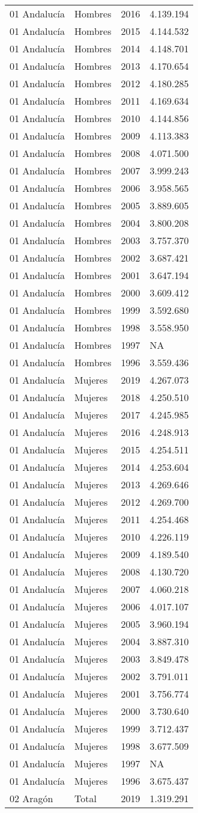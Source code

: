 \documentclass[
]{article}
\begin{document}
\begin{longtable}[]{@{}llrl@{}}
01 Andalucía & Hombres & 2016 & 4.139.194\tabularnewline
01 Andalucía & Hombres & 2015 & 4.144.532\tabularnewline
01 Andalucía & Hombres & 2014 & 4.148.701\tabularnewline
01 Andalucía & Hombres & 2013 & 4.170.654\tabularnewline
01 Andalucía & Hombres & 2012 & 4.180.285\tabularnewline
01 Andalucía & Hombres & 2011 & 4.169.634\tabularnewline
01 Andalucía & Hombres & 2010 & 4.144.856\tabularnewline
01 Andalucía & Hombres & 2009 & 4.113.383\tabularnewline
01 Andalucía & Hombres & 2008 & 4.071.500\tabularnewline
01 Andalucía & Hombres & 2007 & 3.999.243\tabularnewline
01 Andalucía & Hombres & 2006 & 3.958.565\tabularnewline
01 Andalucía & Hombres & 2005 & 3.889.605\tabularnewline
01 Andalucía & Hombres & 2004 & 3.800.208\tabularnewline
01 Andalucía & Hombres & 2003 & 3.757.370\tabularnewline
01 Andalucía & Hombres & 2002 & 3.687.421\tabularnewline
01 Andalucía & Hombres & 2001 & 3.647.194\tabularnewline
01 Andalucía & Hombres & 2000 & 3.609.412\tabularnewline
01 Andalucía & Hombres & 1999 & 3.592.680\tabularnewline
01 Andalucía & Hombres & 1998 & 3.558.950\tabularnewline
01 Andalucía & Hombres & 1997 & NA\tabularnewline
01 Andalucía & Hombres & 1996 & 3.559.436\tabularnewline
01 Andalucía & Mujeres & 2019 & 4.267.073\tabularnewline
01 Andalucía & Mujeres & 2018 & 4.250.510\tabularnewline
01 Andalucía & Mujeres & 2017 & 4.245.985\tabularnewline
01 Andalucía & Mujeres & 2016 & 4.248.913\tabularnewline
01 Andalucía & Mujeres & 2015 & 4.254.511\tabularnewline
01 Andalucía & Mujeres & 2014 & 4.253.604\tabularnewline
01 Andalucía & Mujeres & 2013 & 4.269.646\tabularnewline
01 Andalucía & Mujeres & 2012 & 4.269.700\tabularnewline
01 Andalucía & Mujeres & 2011 & 4.254.468\tabularnewline
01 Andalucía & Mujeres & 2010 & 4.226.119\tabularnewline
01 Andalucía & Mujeres & 2009 & 4.189.540\tabularnewline
01 Andalucía & Mujeres & 2008 & 4.130.720\tabularnewline
01 Andalucía & Mujeres & 2007 & 4.060.218\tabularnewline
01 Andalucía & Mujeres & 2006 & 4.017.107\tabularnewline
01 Andalucía & Mujeres & 2005 & 3.960.194\tabularnewline
01 Andalucía & Mujeres & 2004 & 3.887.310\tabularnewline
01 Andalucía & Mujeres & 2003 & 3.849.478\tabularnewline
01 Andalucía & Mujeres & 2002 & 3.791.011\tabularnewline
01 Andalucía & Mujeres & 2001 & 3.756.774\tabularnewline
01 Andalucía & Mujeres & 2000 & 3.730.640\tabularnewline
01 Andalucía & Mujeres & 1999 & 3.712.437\tabularnewline
01 Andalucía & Mujeres & 1998 & 3.677.509\tabularnewline
01 Andalucía & Mujeres & 1997 & NA\tabularnewline
01 Andalucía & Mujeres & 1996 & 3.675.437\tabularnewline
02 Aragón & Total & 2019 & 1.319.291\tabularnewline

\end{longtable}
\end{document}
